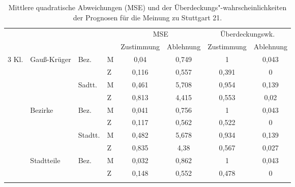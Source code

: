 \documentclass{Vorlage}
\begin{document}
\begin{table}[h]
\centering
\caption{Mittlere quadratische Abweichungen (MSE) und der Überdeckungs"-wahrscheinlichkeiten der Prognosen für die Meinung zu Stuttgart 21.}
\label{vali}
\begin{tabular}{llll|cc|cc}
\hline \hline
                        &                               &                          &   & \multicolumn{2}{c|}{MSE} & \multicolumn{2}{c}{Überdeckungswk.} \\
                        &                               &                          &   & Zustimmung  & Ablehnung  & Zustimmung        & Ablehnung       \\ \hline
\multirow{12}{*}{3 Kl.} & \multirow{4}{*}{Gauß-Krüger} & \multirow{2}{*}{Bez.}    & M & 0,04        & 0,749      & 1                 & 0,043           \\
                        &                               &                          & Z & 0,116       & 0,557      & 0,391             & 0               \\ \cline{3-8} 
                        &                               & \multirow{2}{*}{Sadtt.}  & M & 0,461       & 5,708      & 0,954             & 0,139           \\
                        &                               &                          & Z & 0,813       & 4,415      & 0,553             & 0,02            \\ \cline{2-8} 
                        & \multirow{4}{*}{Bezirke}      & \multirow{2}{*}{Bez.}    & M & 0,041       & 0,756      & 1                 & 0,043           \\
                        &                               &                          & Z & 0,117       & 0,562      & 0,522             & 0               \\ \cline{3-8} 
                        &                               & \multirow{2}{*}{Stadtt.} & M & 0,482       & 5,678      & 0,934             & 0,139           \\
                        &                               &                          & Z & 0,835       & 4,38       & 0,567             & 0,027           \\ \cline{2-8} 
                        & \multirow{4}{*}{Stadtteile}   & \multirow{2}{*}{Bez.}    & M & 0,032      & 0,862     &      1             &   0,043          \\
                        &                               &                          & Z & 0,148       & 0,552      &     0,478         &     0 \\ \cline{3-8} 

\end{tabular}
\end{table}
\end{document}
